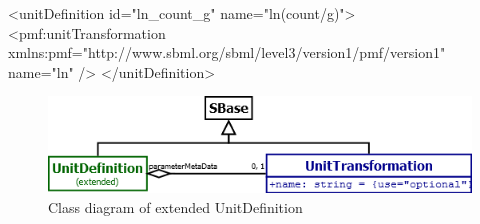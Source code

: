 \begin{example}
<unitDefinition id="ln_count_g" name="ln(count/g)">
  <pmf:unitTransformation xmlns:pmf="http://www.sbml.org/sbml/level3/version1/pmf/version1"
    name="ln" />
</unitDefinition>
\end{example}

\begin{figure}
	\includegraphics[scale=0.7]{img/unitdefinition_uml}
	\caption{Class diagram of extended UnitDefinition}
	\label{unitdefinition_uml}
\end{figure}
